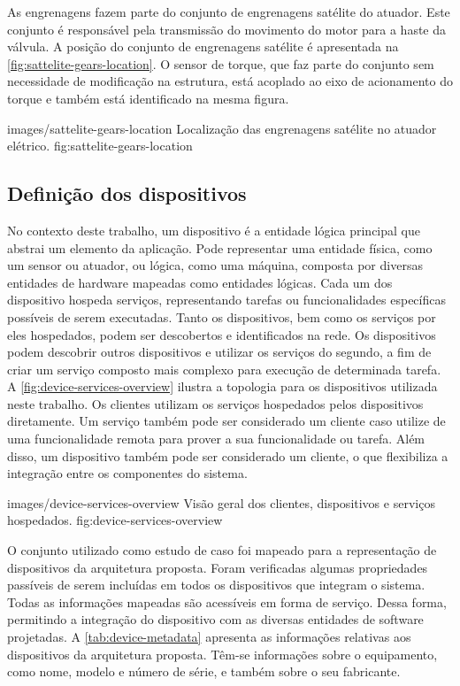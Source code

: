 As engrenagens fazem parte do conjunto de engrenagens satélite do atuador. Este conjunto é
responsável pela transmissão do movimento do motor para a haste da válvula. A posição do conjunto de
engrenagens satélite é apresentada na \cref{fig:sattelite-gears-location}. O sensor de torque, que
faz parte do conjunto sem necessidade de modificação na estrutura, está acoplado ao eixo de
acionamento do torque e também está identificado na mesma figura.

  {images/sattelite-gears-location}
  {Localização das engrenagens satélite no atuador elétrico.}
  {fig:sattelite-gears-location}


\subsection{Definição dos dispositivos}

No contexto deste trabalho, um dispositivo é a entidade lógica principal que abstrai um elemento da
aplicação. Pode representar uma entidade física, como um sensor ou atuador, ou lógica, como uma
máquina, composta por diversas entidades de hardware mapeadas como entidades lógicas. Cada um dos
dispositivo hospeda serviços, representando tarefas ou funcionalidades específicas possíveis de
serem executadas. Tanto os dispositivos, bem como os serviços por eles hospedados, podem ser
descobertos e identificados na rede. Os dispositivos podem descobrir outros dispositivos e utilizar
os serviços do segundo, a fim de criar um serviço composto mais complexo para execução de
determinada tarefa. A \cref{fig:device-services-overview} ilustra a topologia para os dispositivos
utilizada neste trabalho. Os clientes utilizam os serviços hospedados pelos dispositivos
diretamente. Um serviço também pode ser considerado um cliente caso utilize de uma funcionalidade
remota para prover a sua funcionalidade ou tarefa. Além disso, um dispositivo também pode ser
considerado um cliente, o que flexibiliza a integração entre os componentes do sistema.

    {images/device-services-overview}
    {Visão geral dos clientes, dispositivos e serviços hospedados.}
    {fig:device-services-overview}

O conjunto utilizado como estudo de caso foi mapeado para a representação de dispositivos da
arquitetura proposta. Foram verificadas algumas propriedades passíveis de serem incluídas em todos
os dispositivos que integram o sistema. Todas as informações mapeadas são acessíveis em forma de
serviço. Dessa forma, permitindo a integração do dispositivo com as diversas entidades de software
projetadas. A \cref{tab:device-metadata} apresenta as informações relativas aos dispositivos da
arquitetura proposta. Têm-se informações sobre o equipamento, como nome, modelo e número de série, e
também sobre o seu fabricante.

